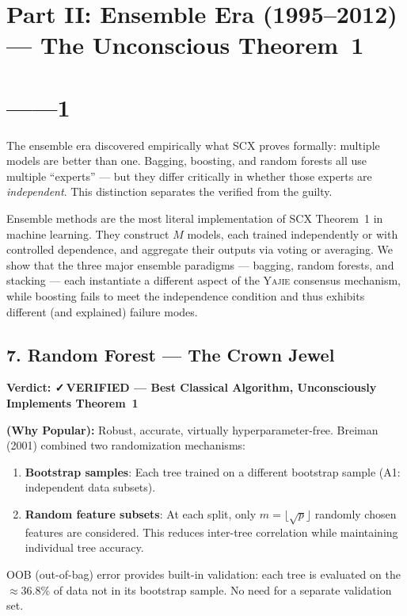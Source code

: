 \documentclass[12pt,a4paper]{article}
\theoremstyle{definition}
\newcommand{\verified}{{\color{verifiedcolor}\textbf{✓\,VERIFIED}}}
\newcommand{\Yajie}{\textsc{Yajie}}
\newcommand{\SCX}{\textsc{SCX}}
\newcommand{\auditHeader}[1]{\medskip\noindent\textbf{\large #1}\medskip}
\newcommand{\whyPopular}{\noindent\textbf{ (Why Popular):} }
\begin{document}
\section{Part II: Ensemble Era (1995--2012) — The Unconscious Theorem~1}
\section{——1}
\label{sec:ensemble}

The ensemble era discovered empirically what \SCX{} proves formally: multiple models are better than one. Bagging, boosting, and random forests all use multiple ``experts'' — but they differ critically in whether those experts are \textit{independent}. This distinction separates the verified from the guilty.

Ensemble methods are the most literal implementation of \SCX{} Theorem~1 in machine learning. They construct $M$ models, each trained independently or with controlled dependence, and aggregate their outputs via voting or averaging. We show that the three major ensemble paradigms — bagging, random forests, and stacking — each instantiate a different aspect of the \Yajie{} consensus mechanism, while boosting fails to meet the independence condition and thus exhibits different (and explained) failure modes.

\subsection{7. Random Forest  — The Crown Jewel}
\label{sec:random_forest}

\auditHeader{Verdict: \verified{} — Best Classical Algorithm, Unconsciously Implements Theorem~1}

\whyPopular{} Robust, accurate, virtually hyperparameter-free. Breiman (2001) combined two randomization mechanisms:
\begin{enumerate}[nosep]
    \item \textbf{Bootstrap samples}: Each tree trained on a different bootstrap sample (A1: independent data subsets).
    \item \textbf{Random feature subsets}: At each split, only $m = \lfloor\sqrt{p}\rfloor$ randomly chosen features are considered. This reduces inter-tree correlation while maintaining individual tree accuracy.
\end{enumerate}
OOB (out-of-bag) error provides built-in validation: each tree is evaluated on the $\approx 36.8\%$ of data not in its bootstrap sample. No need for a separate validation set.
\end{document}
